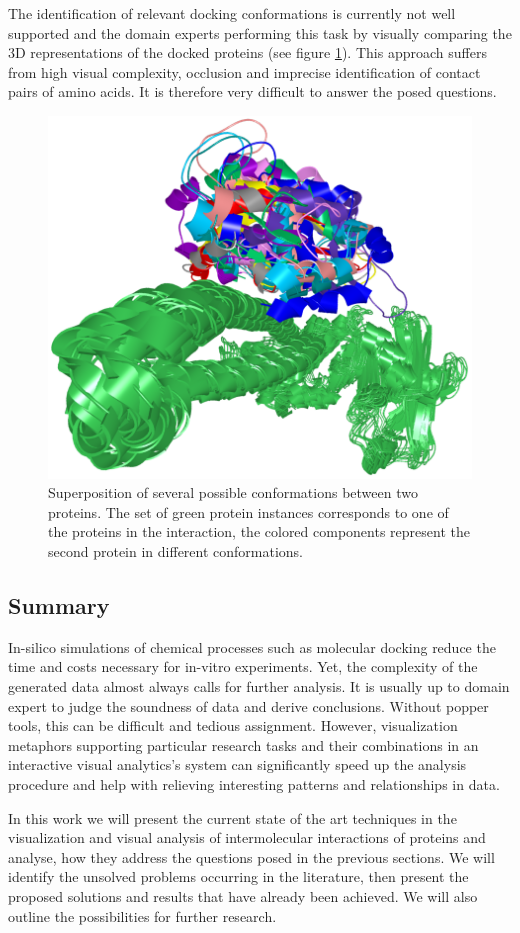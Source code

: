 The identification of relevant docking conformations is currently not well supported and the domain experts performing this task by visually comparing the 3D representations of the docked proteins (see figure \ref{Fig:problem}). This approach suffers from high visual complexity, occlusion and imprecise identification of contact pairs of amino acids. It is therefore very difficult to answer the posed questions.

\begin{figure}[H]
  \centering
  \includegraphics[width=0.5\linewidth]{pictures/problem.png} 
  \caption{Superposition of several possible conformations between two proteins. The set of green protein instances corresponds to one of the proteins in the interaction, the colored components represent the second protein in different conformations.}
  \label{Fig:problem}  
\end{figure} 

\subsection{Summary}
In-silico simulations of chemical processes such as molecular docking reduce the time and costs necessary for in-vitro experiments. Yet, the complexity of the generated data almost always calls for further analysis. It is usually up to domain expert to judge the soundness of data and derive conclusions. Without popper tools, this can be difficult and tedious assignment. However, visualization metaphors supporting particular research tasks and  their combinations in an interactive visual analytics's system can significantly speed up the analysis procedure and help with relieving interesting patterns and relationships in data. 

In this work we will present the current state of the art techniques in the visualization and visual analysis of intermolecular interactions of proteins and analyse, how they address the questions posed in the previous sections. We will identify the unsolved problems occurring in the literature, then present the proposed solutions and results that have already been achieved. We will also outline the possibilities for further research.